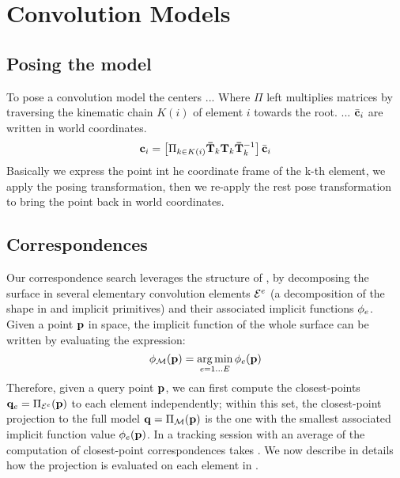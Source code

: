 \section{Convolution Models}


\subsection{Posing the model}
\label{sec:posing}
% 
\begin{DRAFT}
To pose a convolution model the centers ... 
Where $\Pi$ left multiplies matrices by traversing the kinematic chain $K(i)$ of element $i$ towards the root.
... $\bar{\mathbf{c}}_i$ are written in world coordinates.
% 
\begin{equation}
\mathbf{c}_i = \left[ \Pi_{k \in K(i)} \mathbf{\bar{T}}_k \mathbf{T}_k \mathbf{\bar{T}}_k^{-1} \right] \bar{\mathbf{c}}_i
\end{equation}
% 
Basically we express the point int he coordinate frame of the k-th element, we apply the posing transformation, then we re-apply the rest pose transformation to bring the point back in world coordinates.
\end{DRAFT}

\subsection{Correspondences}
\label{sec:corresp}
Our correspondence search leverages the structure of , by decomposing the surface in several elementary convolution elements $\mathcal{E}^e$ (a decomposition of the shape in  and  implicit primitives) and their associated implicit functions $\phi_e$. Given a point $\mathbf{p}$ in space, the implicit function of the whole surface can be written by evaluating the expression:
\begin{equation}
\phi_{\mathcal{M}}(\mathbf{p}) = \operatorname*{arg\,min}_{e=1 \dots E} \phi_e(\mathbf{p})
\label{eq:piecewise}
\end{equation}
Therefore, given a query point $\mathbf{p}$, we can first compute the closest-points $\mathbf{q}_e = \Pi_{\mathcal{E}^e}(\mathbf{p})$ to each element independently; within this set, the closest-point projection to the full model $\mathbf{q} = \Pi_{\mathcal{M}}(\mathbf{p})$ is the one with the smallest associated implicit function value $\phi_e(\mathbf{p})$. In a tracking session with an average of  the computation of closest-point correspondences takes . We now describe in details how the projection is evaluated on each element in . 

